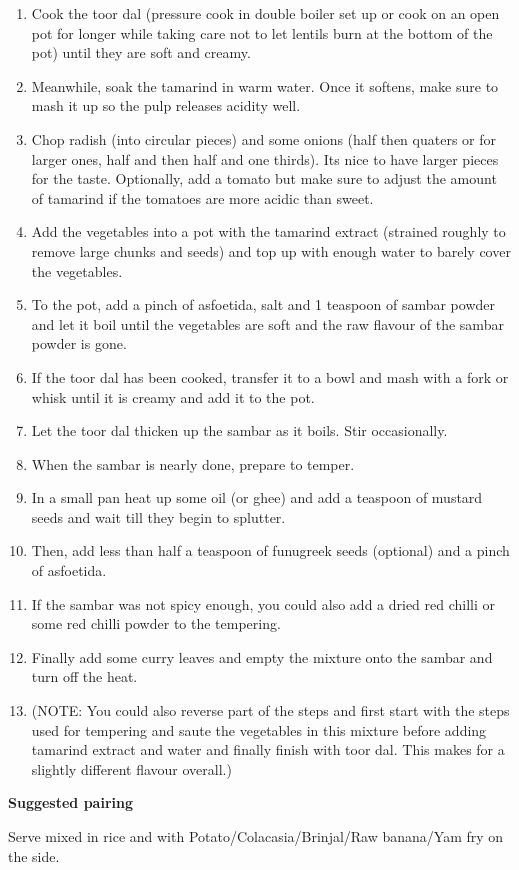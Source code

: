 \begin{enumerate}
  \item Cook the toor dal (pressure cook in double boiler set up or cook on an open pot for longer while taking care not to let lentils burn at the bottom of the pot) until they are soft and creamy.
  \item Meanwhile, soak the tamarind in warm water. Once it softens, make sure to mash it up so the pulp releases acidity well.
  \item Chop radish (into circular pieces) and some onions (half then quaters or for larger ones, half and then half and one thirds). Its nice to have larger pieces for the taste. Optionally, add a tomato but make sure to adjust the amount of tamarind if the tomatoes are more acidic than sweet.
  \item Add the vegetables into a pot with the tamarind extract (strained roughly to remove large chunks and seeds) and top up with enough water to barely cover the vegetables.
  \item To the pot, add a pinch of asfoetida, salt and 1 teaspoon of sambar powder and let it boil until the vegetables are soft and the raw flavour of the sambar powder is gone.
  \item If the toor dal has been cooked, transfer it to a bowl and mash with a fork or whisk until it is creamy and add it to the pot.
  \item Let the toor dal thicken up the sambar as it boils. Stir occasionally.
  \item When the sambar is nearly done, prepare to temper.
  \item In a small pan heat up some oil (or ghee) and add a teaspoon of mustard seeds and wait till they begin to splutter.
  \item Then, add less than half a teaspoon of funugreek seeds (optional) and a pinch of asfoetida.
  \item If the sambar was not spicy enough, you could also add a dried red chilli or some red chilli powder to the tempering.
  \item Finally add some curry leaves and empty the mixture onto the sambar and turn off the heat.
  \item (NOTE: You could also reverse part of the steps and first start with the steps used for tempering and saute the vegetables in this mixture before adding tamarind extract and water and finally finish with toor dal. This makes for a slightly different flavour overall.)
\end{enumerate}

\large{\textbf{Suggested pairing}}

Serve mixed in rice and with Potato/Colacasia/Brinjal/Raw banana/Yam fry on the side.
